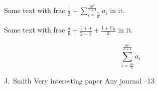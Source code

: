 \documentclass{article}
\begin{document}

\author{Author's Name}

Some text with frac $\frac{1}{2} + \sum_{i=\frac{m}{n}}^{\frac{m^2}{n+1}} a_i$ in it.

Some text with frac $\frac{a}{b}+\frac{1+\alpha}{2-\beta}+\frac{1+C_0}{2}$ in it.

$$
\sum_{i=\frac{m}{n}}^{\frac{m^2}{n+1}} a_i
$$

\begin{thebibliography}{99}
\by J.~Smith
\paper Very interesting paper
\jour Any journal
--13
\end{thebibliography}
\end{document}
